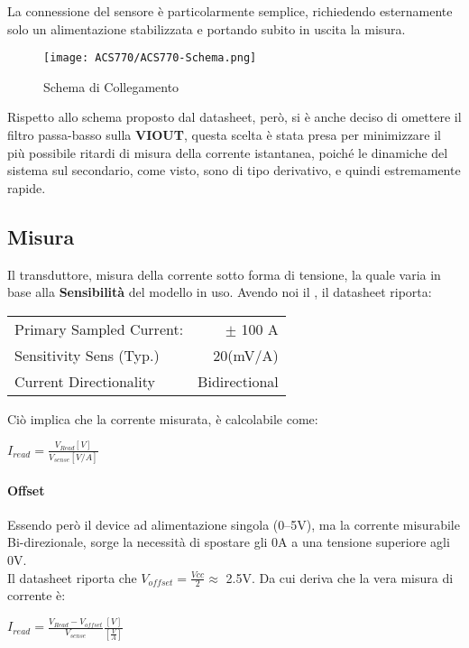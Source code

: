 La connessione del sensore è particolarmente semplice, richiedendo esternamente solo un alimentazione stabilizzata e portando subito in uscita la misura.
\begin{figure}[h]
	\centering
	\texttt{[image: ACS770/ACS770-Schema.png]}
	\caption[ Schema di collegamento]{Schema di Collegamento}
\end{figure}

\noindent
Rispetto allo schema proposto dal datasheet, però, si è anche deciso di omettere il filtro passa-basso sulla \textbf{VIOUT}, questa scelta è stata presa per minimizzare il più possibile ritardi di misura della corrente istantanea, poiché le dinamiche del sistema sul secondario, come visto, sono di tipo derivativo, e quindi estremamente rapide.\\

\subsection{Misura}
Il transduttore, misura della corrente sotto forma di tensione, la quale varia in base alla \textbf{Sensibilità} del modello in uso. 
Avendo noi il , il datasheet riporta:
\begin{center}
	\begin{tabular}[t]{|l r|}
		\hline
		Primary Sampled Current: & $\pm$ 100 A   \\
		Sensitivity Sens (Typ.)  & 20(mV/A)      \\
		Current Directionality   & Bidirectional \\
		\hline
	\end{tabular}
\end{center}

\noindent
Ciò implica che la corrente misurata, è calcolabile come:
{\large \begin{center}
	$I_{read} = \frac{V_{Read}[V]}{V_{sense}[V/A]}$
\end{center}
}
\paragraph{Offset}
Essendo però il device ad alimentazione singola (0--5V), ma la corrente misurabile Bi-direzionale, sorge la necessità di spostare gli 0A a una tensione superiore agli 0V.\\
Il datasheet riporta che $V_{offset} = \frac{Vcc}{2}\approx$ 2.5V. Da cui deriva che la vera misura di corrente è:
{\LARGE
\begin{center}
	$I_{read} = \frac{V_{Read}-V_{offset}}{V_{sense}}\frac{[V]}{[\frac{V}{A}]}$
\end{center}
}

